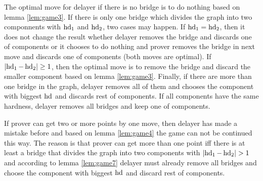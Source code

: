 \documentclass[12pt]{book}
\begin{document}
\begin{lem}\label{lem:game7}
      The optimal move for delayer if there is no bridge is to do nothing based on lemma \ref{lem:game3}. If there is only one bridge 
	  which divides the graph into two componnents with $\operatorname{hd}_1$ and $\operatorname{hd}_2$, two cases may happen. If $\operatorname{hd}_1= \operatorname{hd}_2$, 
	  then it does not change the result whether delayer removes the bridge  and discards one of components or it chooses to do nothing and 
	  prover removes the bridge in next move and discards one of components (both moves are optimal). If $ \lvert \operatorname{hd}_1- \operatorname{hd}_2  \rvert \geq 1$, 
	  then the optimal move is to remove the bridge and discard the smaller component based on lemma \ref{lem:game3}. Finally, if there are 
	  more than one bridge in the graph, delayer removes all of them and chooses the component with biggest $\operatorname{hd}$ and discards rest of 
	  components. If all components have the same hardness, delayer removes all bridges and keep one of components.
	  
\end{lem}

\begin{lem}\label{lem:game5}
      If prover can get two or more points by one move, then delayer has made a mistake before and based on lemma \ref{lem:game4} the game can 
	  not be continued this way. The reason is that prover can get more than one point iff there is at least a bridge that divides the graph 
	  into two components with $ \lvert \operatorname{hd}_1- \operatorname{hd}_2  \rvert > 1$ and according to lemma \ref{lem:game7} delayer must already remove
	  all bridges and choose the component with biggest $\operatorname{hd}$ and discard rest of components.
	  
\end{lem}
\end{document}
